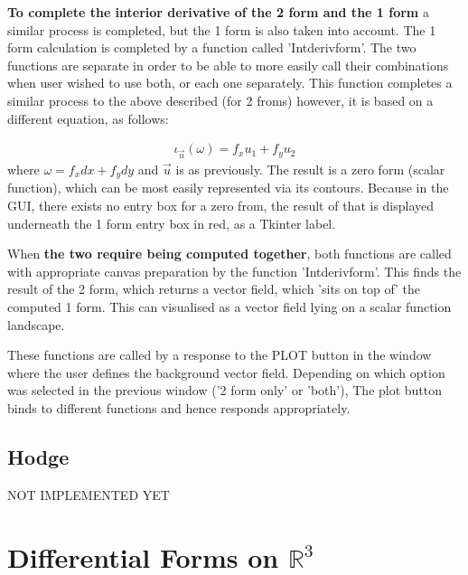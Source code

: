 \documentclass[12pt]{report}
\begin{document}
\noindent \textbf{To complete the interior derivative of the 2 form and the 1 form} a similar process is completed, but the 1 form is also taken into account. The 1 form calculation is completed by a function called 'Int\textunderscore deriv\textunderscore form'. The two functions are separate in order to be able to more easily call their combinations when user wished to use both, or each one separately. This function completes a similar process to the above described (for 2 froms) however, it is based on a different equation, as follows:

\begin{equation}
	\label{T2} \begin{split}
		\iota_{\vec{u}}(\omega) = f_{x} u_{1} + f_{y} u_{2}
	\end{split}
\end{equation}
where $\omega = f_{x} dx + f_{y} dy$ and $\vec{u}$ is as previously. The result is a zero form (scalar function), which can be most easily represented via its contours. Because in the GUI, there exists no entry box for a zero from, the result of that is displayed underneath the 1 form entry box in red, as a Tkinter label.

When \textbf{the two require being computed together}, both functions are called with appropriate canvas preparation by the function 'Int\textunderscore deriv\textunderscore form'. This finds the result of the 2 form, which returns a vector field, which 'sits on top of' the computed 1 form. This can visualised as a vector field lying on a scalar function landscape.

\noindent These functions are called by a response to the PLOT button in the window where the user defines the background vector field. Depending on which option was selected in the previous window ('2 form only' or 'both'), The plot button binds to different functions and hence responds appropriately.

\section{Hodge}


NOT IMPLEMENTED YET



\chapter{Differential Forms on $\mathbb{R}^{3}$}
\end{document}
